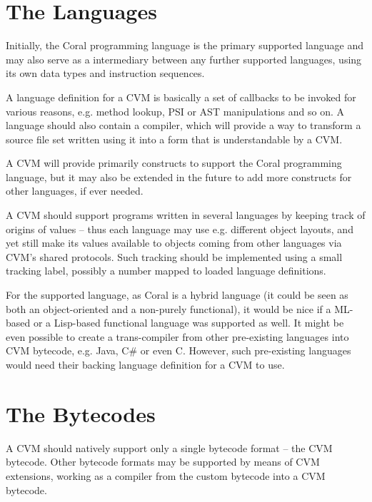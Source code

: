 \section{The Languages}

Initially, the Coral programming language is the primary supported language and may also serve as a intermediary between any further supported languages, using its own data types and instruction sequences. 

A language definition for a CVM is basically a set of callbacks to be invoked for various reasons, e.g. method lookup, PSI or AST manipulations and so on. A language should also contain a compiler, which will provide a way to transform a source file set written using it into a form that is understandable by a CVM. 

A CVM will provide primarily constructs to support the Coral programming language, but it may also be extended in the future to add more constructs for other languages, if ever needed. 

A CVM should support programs written in several languages by keeping track of origins of values -- thus each language may use e.g. different object layouts, and yet still make its values available to objects coming from other languages via CVM's shared protocols. Such tracking should be implemented using a small tracking label, possibly a number mapped to loaded language definitions. 

For the supported language, as Coral is a hybrid language (it could be seen as both an object-oriented and a non-purely functional), it would be nice if a ML-based or a Lisp-based functional language was supported as well. It might be even possible to create a trans-compiler from other pre-existing languages into CVM bytecode, e.g. Java, C\# or even C. However, such pre-existing languages would need their backing language definition for a CVM to use. 





\section{The Bytecodes}

A CVM should natively support only a single bytecode format -- the CVM bytecode. Other bytecode formats may be supported by means of CVM extensions, working as a compiler from the custom bytecode into a CVM bytecode. 





